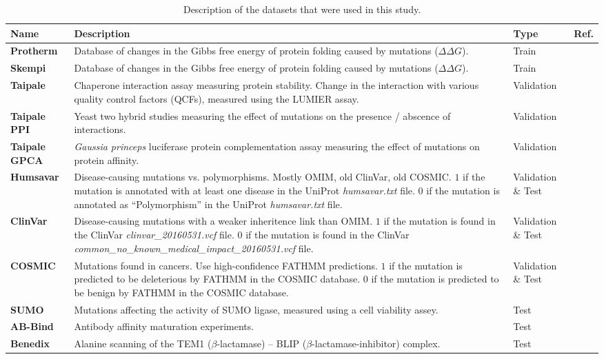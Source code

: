 \begin{table}[ht]
	\caption[Datasets used in this study.]{Description of the datasets that were used in this study.}
	\label{tab:datasets}
	\begin{tabular}{l | p{9cm} | p{2cm} | p{0.5cm}}
		\toprule
		Name & Description & Type & Ref. \\
		\midrule
		\textbf{Protherm} & Database of changes in the Gibbs free energy of protein folding caused by mutations ($\Delta \Delta G$). & Train & \cite{kumar_protherm_2006} \\
		\textbf{Skempi} & Database of changes in the Gibbs free energy of protein folding caused by mutations ($\Delta \Delta G$). & Train & \cite{moal_skempi:_2012} \\
		\textbf{Taipale} & Chaperone interaction assay measuring protein stability. Change in the interaction with various quality control factors (QCFs), measured using the LUMIER assay. & Validation & \cite{sahni_widespread_2015} \\
		\textbf{Taipale PPI} & Yeast two hybrid studies measuring the effect of mutations on the presence / abscence of interactions. & Validation & \cite{sahni_widespread_2015} \\
		\textbf{Taipale GPCA} & \textit{Gaussia princeps} luciferase protein complementation assay measuring the effect of mutations on protein affinity. & Validation & \cite{sahni_widespread_2015} \\
		\textbf{Humsavar} & Disease-causing mutations vs. polymorphisms. Mostly OMIM, old ClinVar, old COSMIC. $1$ if the mutation is annotated with at least one disease in the UniProt \textit{humsavar.txt} file. $0$ if the mutation is annotated as ``Polymorphism'' in the UniProt \textit{humsavar.txt} file. & Validation \& Test & \cite{consortium_uniprot:_2015} \\
		\textbf{ClinVar} & Disease-causing mutations with a weaker inheritence link than OMIM. $1$ if the mutation is found in the ClinVar \textit{clinvar\_20160531.vcf} file. $0$ if the mutation is found in the ClinVar \textit{common\_no\_known\_medical\_impact\_20160531.vcf} file. & Validation \& Test & \cite{landrum_clinvar:_2016} \\
		\textbf{COSMIC} & Mutations found in cancers. Use high-confidence FATHMM predictions. $1$ if the mutation is predicted to be deleterious by FATHMM in the COSMIC database. $0$ if the mutation is predicted to be benign by FATHMM in the COSMIC database. & Validation \& Test & \cite{forbes_cosmic:_2015} \\
		\textbf{SUMO} & Mutations affecting the activity of SUMO ligase, measured using a cell viability assey. & Test & \cite{cagi4_sumo_ligase} \\
		\textbf{AB-Bind} & Antibody affinity maturation experiments. & Test & \cite{sirin_ab-bind:_2016} \\
		\textbf{Benedix} & Alanine scanning of the TEM1 ($\beta$-lactamase) -- BLIP ($\beta$-lactamase-inhibitor) complex. & Test & \cite{benedix_predicting_2009} \\
	\end{tabular}
\end{table}


